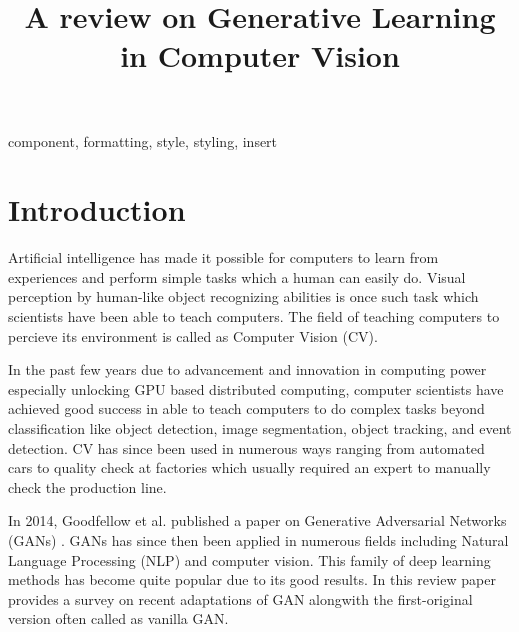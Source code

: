 \documentclass[conference]{IEEEtran}
\begin{document}
\title{A review on Generative Learning in Computer Vision}

\author{
}

\maketitle

\begin{abstract}

\end{abstract}

\begin{IEEEkeywords}
component, formatting, style, styling, insert
\end{IEEEkeywords}

\section{Introduction}
Artificial intelligence has made it possible for computers to learn from experiences and perform simple tasks which a human can easily do. Visual perception by human-like object recognizing abilities is once such task which scientists have been able to teach computers. The field of teaching computers to percieve its environment is called as Computer Vision (CV). 

In the past few years due to advancement and innovation in computing power especially unlocking GPU based distributed computing, computer scientists have achieved good success in able to teach computers to do complex tasks beyond classification like object detection, image segmentation, object tracking, and event detection. CV has since been used in numerous ways ranging from automated cars to quality check at factories which usually required an expert to manually check the production line.

In 2014, Goodfellow et al. published a paper on Generative Adversarial Networks (GANs) \cite{b1}. GANs has since then been applied in numerous fields including Natural Language Processing (NLP) and computer vision. This family of deep learning methods has become quite popular due to its good results. In this review paper provides a survey on recent adaptations of GAN alongwith the first-original version often called as vanilla GAN.
\end{document}
